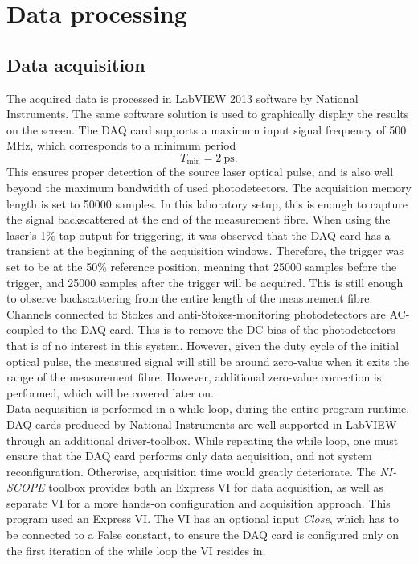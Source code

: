 \documentclass{standalone}
\begin{document}
\chapter{Data processing} \label{ch:data_processing}
\setcounter{page}\thestranica


\section{Data acquisition}

The acquired data is processed in LabVIEW 2013 software by National Instruments. The same software solution is used to graphically display the results on the screen. The DAQ card supports a maximum input signal frequency of 500 MHz, which corresponds to a minimum period
\begin{equation}
T_\textrm{min} = \SI{2}{\pico \second} \textrm{.}
\end{equation}
This ensures proper detection of the source laser optical pulse, and is also well beyond the maximum bandwidth of used photodetectors. The acquisition memory length is set to 50000 samples. In this laboratory setup, this is enough to capture the signal backscattered at the end of the measurement fibre. When using the laser's 1\% tap output for triggering, it was observed that the DAQ card has a transient at the beginning of the acquisition windows. Therefore, the trigger was set to be at the 50\% reference position, meaning that 25000 samples before the trigger, and 25000 samples after the trigger will be acquired. This is still enough to observe backscattering from the entire length of the measurement fibre. Channels connected to Stokes and anti-Stokes-monitoring photodetectors are AC-coupled to the DAQ card. This is to remove the DC bias of the photodetectors that is of no interest in this system. However, given the duty cycle of the initial optical pulse, the measured signal will still be around zero-value when it exits the range of the measurement fibre. However, additional zero-value correction is performed, which will be covered later on. \\

Data acquisition is performed in a while loop, during the entire program runtime. DAQ cards produced by National Instruments are well supported in LabVIEW through an additional driver-toolbox. While repeating the while loop, one must ensure that the DAQ card performs only data acquisition, and not system reconfiguration. Otherwise, acquisition time would greatly deteriorate. The \textit{NI-SCOPE} toolbox provides both an Express VI for data acquisition, as well as separate VI for a more hands-on configuration and acquisition approach. This program used an Express VI. The VI has an optional input \textit{Close}, which has to be connected to a False constant, to ensure the DAQ card is configured only on the first iteration of the while loop the VI resides in. \\
\end{document}
